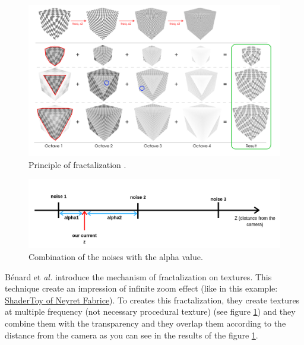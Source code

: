 \begin{figure}
    \begin{center}
    \includegraphics[scale=0.3]{images/fractalization_principle.png}
    \end{center}
    \caption{Principle of fractalization \cite{benard_dynamic_2010}.}
    \label{fractalization_principle}
\end{figure}

\begin{figure}
    \begin{center}
    \includegraphics[scale=0.5]{images/fractalization_practical.png}
    \end{center}
    \caption{Combination of the noises with the alpha value.}
    \label{fractalization_practical}
\end{figure}


Bénard et \textit{al.}\cite{benard_dynamic_2010} introduce the mechanism of fractalization on textures. This technique create an impression of infinite zoom effect (like in this example: \href{https://www.shadertoy.com/view/XlBXWw?fbclid=IwAR1fU2JxQzXtks1ZcmVmzrHiv646G8w2gWceeiV-UToeFkAFMQ2NecbsGGs}{ShaderToy of Neyret Fabrice}). To creates this fractalization, they create textures at multiple frequency (not necessary procedural texture) (see figure \ref{fractalization_principle}) and they combine them with the transparency and they overlap them according to the distance from the camera as you can see in the results of the figure \ref{fractalization_principle}.


